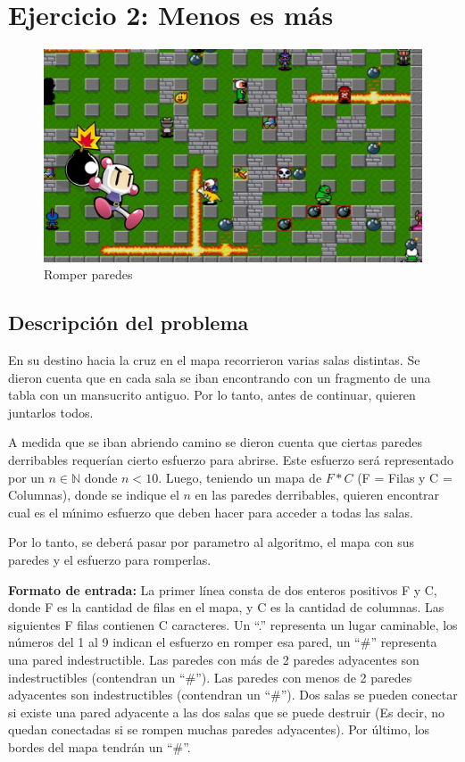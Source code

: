 
\section{Ejercicio 2: Menos es más}

	\begin{figure}[ht]
		\begin{center}
			\includegraphics[width=0.5\columnwidth]{imagenes/balanza.jpg}
			\caption{Romper paredes}
		\end{center}
	\end{figure}

	\subsection{Descripción del problema}
	En su destino hacia la cruz en el mapa recorrieron varias salas distintas. Se dieron cuenta que en cada sala se iban encontrando con un fragmento de una tabla con un mansucrito antiguo. Por lo tanto, antes de continuar, quieren juntarlos todos.\par
	A medida que se iban abriendo camino se dieron cuenta que ciertas paredes derribables requerían cierto esfuerzo para
	abrirse. Este esfuerzo será representado por un $n\in{\mathbb{N}}$ donde $n < 10$. Luego, teniendo un mapa de $F*C$ (F = Filas y C = Columnas), donde se indique el $n$ en las paredes derribables, quieren encontrar cual es el mı́nimo esfuerzo que deben hacer para acceder a todas las salas. \par

	Por lo tanto, se deberá pasar por parametro al algoritmo, el mapa con sus paredes y el esfuerzo para romperlas. 
	\newline
	~

	\textbf{Formato de entrada:} La primer línea consta de dos enteros positivos F y C, donde F es la cantidad de filas en el mapa, y C es la cantidad de columnas. Las siguientes F filas contienen C caracteres. Un “.” representa un lugar caminable, los números del 1 al 9 indican el esfuerzo en romper esa pared, un “\#” representa una pared indestructible. Las paredes con más de 2 paredes adyacentes son indestructibles (contendran un “\#”). Las paredes con menos de 2 paredes adyacentes son indestructibles (contendran un “\#”). Dos salas se pueden conectar si existe una pared adyacente a las dos salas que se puede destruir (Es decir, no quedan conectadas si se rompen muchas paredes adyacentes). Por último, los bordes del mapa tendrán un “\#”.


